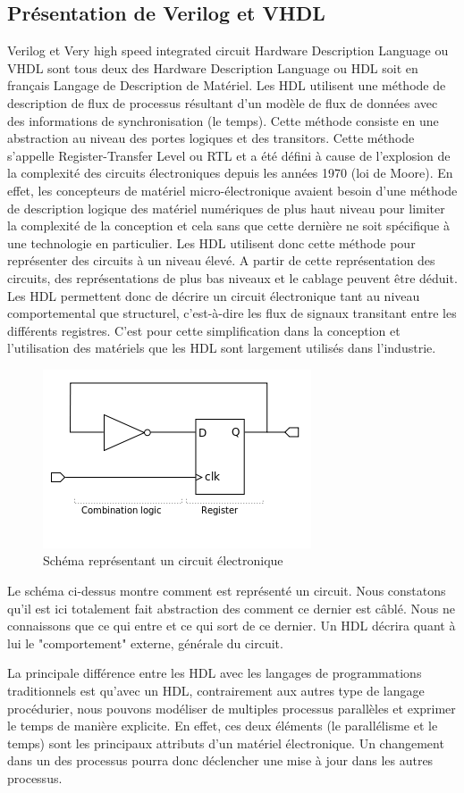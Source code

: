 \vspace{15px}
\subsection{Présentation de Verilog et VHDL}
\vspace{15px}
Verilog et Very high speed integrated circuit Hardware Description Language ou VHDL sont tous deux des Hardware Description Language ou HDL soit en français Langage de Description de Matériel. Les HDL utilisent une méthode de description de flux de processus résultant d'un modèle de flux de données avec des informations de synchronisation (le temps). Cette méthode consiste en une abstraction au niveau des portes logiques et des transitors. Cette méthode s'appelle Register-Transfer Level ou RTL et a été défini à cause de l'explosion de la complexité des circuits électroniques depuis les années 1970 (loi de Moore). En effet, les concepteurs de matériel micro-électronique avaient besoin d'une méthode de description logique des matériel numériques de plus haut niveau pour limiter la complexité de la conception et cela sans que cette dernière ne soit spécifique à une technologie en particulier. Les HDL utilisent donc cette méthode pour représenter des circuits à un niveau élevé. A partir de cette représentation des circuits, des représentations de plus bas niveaux et le cablage peuvent être déduit. Les HDL permettent donc de décrire un circuit électronique tant au niveau comportemental que structurel, c'est-à-dire les flux de signaux transitant entre les différents registres. C'est pour cette simplification dans la conception et l'utilisation des matériels que les HDL sont largement utilisés dans l'industrie.
\newpage
\begin{figure}[h!]
\includegraphics{rtl_example.png}
\caption{Schéma représentant un circuit électronique}  
\end{figure} 
\par
Le schéma ci-dessus montre comment est représenté un circuit. Nous constatons qu'il est ici totalement fait abstraction des comment ce dernier est câblé. Nous ne connaissons que ce qui entre et ce qui sort de ce dernier. Un HDL décrira quant à lui le "comportement" externe, générale du circuit.
\\
\par
La principale différence entre les HDL avec les langages de programmations traditionnels est qu'avec un HDL, contrairement aux autres type de langage procédurier, nous pouvons modéliser de multiples processus parallèles et exprimer le temps de manière explicite. En effet, ces deux éléments (le parallélisme et le temps) sont les principaux attributs d'un matériel électronique. Un changement dans un des processus pourra donc déclencher une mise à jour dans les autres processus.

